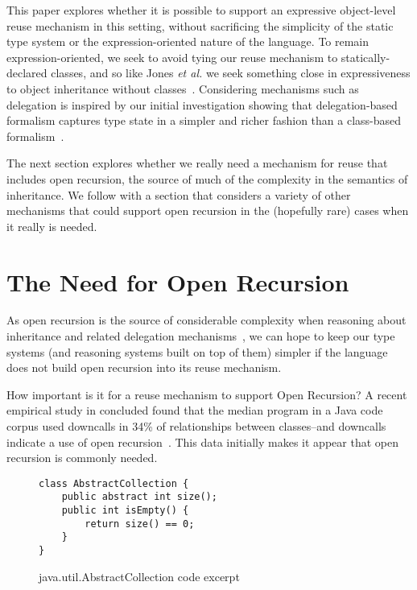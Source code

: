 \documentclass[preprint]{sigplanconf}
\begin{document}
This paper explores whether it is possible to support an expressive
object-level reuse mechanism in this setting, without sacrificing
the simplicity of the static type system or the expression-oriented
nature of the language.  To remain expression-oriented, we seek to
avoid tying our reuse mechanism to statically-declared classes,
and so like Jones \textit{et al.} we seek something close in
expressiveness to object inheritance without
classes~\cite{jones:2016:inheritance}.
Considering mechanisms such
as delegation is inspired by our initial 
investigation showing that delegation-based formalism captures type state in a simpler and richer fashion than a class-based formalism~\cite{li:2015:ftfjp-typestate}.

The next section explores whether we really need a mechanism for reuse
that includes open recursion, the source of much of the complexity in
the semantics of inheritance.  We follow with a section that considers
a variety of other mechanisms that could support open recursion in the 
(hopefully rare) cases when it really is needed.

\section{The Need for Open Recursion}

As open recursion is the source of considerable complexity when
reasoning about inheritance and related delegation
mechanisms~\cite{li:2015:ftfjp-typestate}, we can hope to keep our
type systems (and reasoning systems built on top of them) simpler if
the language does not build open recursion into its reuse mechanism.

How important is it for a reuse mechanism to support Open Recursion?
A recent empirical study in concluded found that the median program
in a Java code corpus used downcalls in 34\% of relationships
between classes--and downcalls indicate a use of open
recursion~\cite{tempero2013programmers}.
This data initially makes it appear that open recursion is commonly
needed.

\begin{figure}
\begin{lstlisting}
class AbstractCollection {
    public abstract int size();
    public int isEmpty() {
        return size() == 0;
    }
}
\end{lstlisting}
\caption{java.util.AbstractCollection code excerpt}
\label{f:abstract-collection}
\end{figure}
\end{document}
